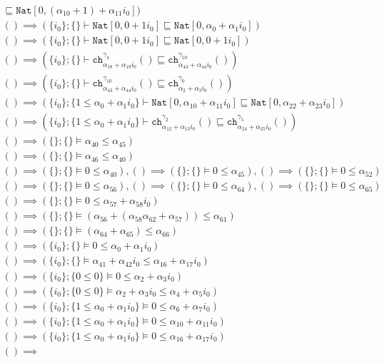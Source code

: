 {\begin{align*}
\sqsubseteq \texttt{Nat}[0, (\alpha_{10}+1) + \alpha_{11}i_{0}])\\ () \implies (\{i_{0}\};\{\}  \vdash \texttt{Nat}[0, 0 + 1i_{0}] \sqsubseteq \texttt{Nat}[0, \alpha_{0} + \alpha_{1}i_{0}])\\ () \implies (\{i_{0}\};\{\}  \vdash \texttt{Nat}[0, 0 + 1i_{0}] \sqsubseteq \texttt{Nat}[0, 0 + 1i_{0}])\\ () \implies (\{i_{0}\};\{\}  \vdash \texttt{ch}^{\gamma_{4}}_{\alpha_{18} + \alpha_{19}i_{0}}() \sqsubseteq \texttt{ch}^{\gamma_{10}}_{\alpha_{43} + \alpha_{44}i_{0}}())\\ () \implies (\{i_{0}\};\{\}  \vdash \texttt{ch}^{\gamma_{10}}_{\alpha_{43} + \alpha_{44}i_{0}}() \sqsubseteq \texttt{ch}^{\gamma_{0}}_{\alpha_{2} + \alpha_{3}i_{0}}())\\ () \implies (\{i_{0}\};\{1 \leq \alpha_{0} + \alpha_{1}i_{0}\}  \vdash \texttt{Nat}[0, \alpha_{10} + \alpha_{11}i_{0}] \sqsubseteq \texttt{Nat}[0, \alpha_{22} + \alpha_{23}i_{0}])\\ () \implies (\{i_{0}\};\{1 \leq \alpha_{0} + \alpha_{1}i_{0}\}  \vdash \texttt{ch}^{\gamma_{2}}_{\alpha_{12} + \alpha_{13}i_{0}}() \sqsubseteq \texttt{ch}^{\gamma_{5}}_{\alpha_{24} + \alpha_{25}i_{0}}())\\ () \implies (\{\};\{\}  \vDash \alpha_{40} \leq \alpha_{45})\\ () \implies (\{\};\{\}  \vDash \alpha_{46} \leq \alpha_{40})\\ () \implies (\{\};\{\}  \vDash 0 \leq \alpha_{40}), () \implies (\{\};\{\}  \vDash 0 \leq \alpha_{45}), () \implies (\{\};\{\}  \vDash 0 \leq \alpha_{52})\\ () \implies (\{\};\{\}  \vDash 0 \leq \alpha_{56}), () \implies (\{\};\{\}  \vDash 0 \leq \alpha_{64}), () \implies (\{\};\{\}  \vDash 0 \leq \alpha_{65})\\ () \implies (\{\};\{\}  \vDash 0 \leq \alpha_{57} + \alpha_{58}i_{0})\\ () \implies (\{\};\{\}  \vDash (\alpha_{56}+(\alpha_{58}\alpha_{62}+\alpha_{57})) \leq \alpha_{61})\\ () \implies (\{\};\{\}  \vDash (\alpha_{64}+\alpha_{65}) \leq \alpha_{66})\\ () \implies (\{i_{0}\};\{\}  \vDash 0 \leq \alpha_{0} + \alpha_{1}i_{0})\\ () \implies (\{i_{0}\};\{\}  \vDash \alpha_{41} + \alpha_{42}i_{0} \leq \alpha_{16} + \alpha_{17}i_{0})\\ () \implies (\{i_{0}\};\{0 \leq 0\}  \vDash 0 \leq \alpha_{2} + \alpha_{3}i_{0})\\ () \implies (\{i_{0}\};\{0 \leq 0\}  \vDash \alpha_{2} + \alpha_{3}i_{0} \leq \alpha_{4} + \alpha_{5}i_{0})\\ () \implies (\{i_{0}\};\{1 \leq \alpha_{0} + \alpha_{1}i_{0}\}  \vDash 0 \leq \alpha_{6} + \alpha_{7}i_{0})\\ () \implies (\{i_{0}\};\{1 \leq \alpha_{0} + \alpha_{1}i_{0}\}  \vDash 0 \leq \alpha_{10} + \alpha_{11}i_{0})\\ () \implies (\{i_{0}\};\{1 \leq \alpha_{0} + \alpha_{1}i_{0}\}  \vDash 0 \leq \alpha_{16} + \alpha_{17}i_{0})\\ () \implies 
\end{align*}}

